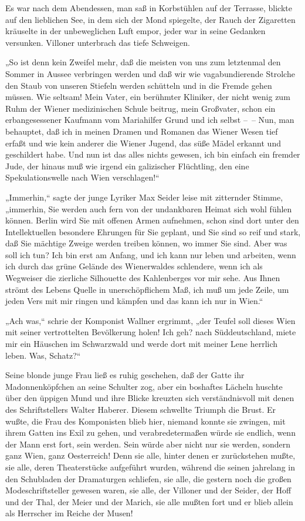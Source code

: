 Es war nach dem Abendessen, man saß in Korbstühlen auf der
Terrasse, blickte auf den lieblichen See, in dem sich der Mond
spiegelte, der Rauch der Zigaretten kräuselte in der unbeweglichen
Luft empor, jeder war in seine Gedanken versunken. Villoner
unterbrach das tiefe Schweigen.

„So ist denn kein Zweifel mehr, daß die meisten von uns zum
letztenmal den Sommer in Aussee verbringen werden und daß wir wie
vagabundierende Strolche den Staub von unseren Stiefeln werden
schütteln und in die Fremde gehen müssen. Wie seltsam! Mein Vater,
ein berühmter Kliniker, der nicht wenig zum Ruhm der Wiener
medizinischen Schule beitrug, mein Großvater, schon ein
erbangesessener Kaufmann vom Mariahilfer Grund und ich selbst –~–
Nun, man behauptet, daß ich in meinen Dramen und Romanen das Wiener
Wesen tief erfaßt und wie kein anderer die Wiener Jugend, das süße
Mädel erkannt und geschildert habe. Und nun ist das alles nichts
gewesen, ich bin einfach ein fremder Jude, der hinaus  muß wie irgend ein galizischer Flüchtling, den eine
Spekulationswelle nach Wien verschlagen!“

„Immerhin,“ sagte der junge Lyriker Max Seider leise mit zitternder
Stimme, „immerhin, Sie werden auch fern von der undankbaren Heimat
sich wohl fühlen können. Berlin wird Sie mit offenen Armen
aufnehmen, schon sind dort unter den Intellektuellen besondere
Ehrungen für Sie geplant, und Sie sind so reif und stark, daß Sie
mächtige Zweige werden treiben können, wo immer Sie sind. Aber was
soll ich tun? Ich bin erst am Anfang, und ich kann nur leben und
arbeiten, wenn ich durch das grüne Gelände des Wienerwaldes
schlendere, wenn ich als Wegweiser die zierliche Silhouette des
Kahlenberges vor mir sehe. Aus Ihnen strömt des Lebens Quelle in
unerschöpflichem Maß, ich muß um jede Zeile, um jeden Vers mit mir
ringen und kämpfen und das kann ich nur in Wien.“

„Ach was,“ schrie der Komponist Wallner ergrimmt, „der Teufel soll
dieses Wien mit seiner vertrottelten Bevölkerung holen! Ich geh?
nach Süddeutschland, miete mir ein Häuschen im Schwarzwald und
werde dort mit meiner Lene herrlich leben. Was, Schatz?“

Seine blonde junge Frau ließ es ruhig geschehen, daß der Gatte ihr
Madonnenköpfchen an seine Schulter zog, aber ein boshaftes Lächeln
huschte über den üppigen Mund und ihre Blicke kreuzten sich
verständnisvoll mit denen des Schriftstellers Walter Haberer.
Diesem schwellte Triumph die Brust. Er wußte, die Frau des
Komponisten blieb hier, niemand konnte sie zwingen, mit ihrem
Gatten ins Exil zu gehen, und verabredetermaßen würde sie endlich,
wenn  der Mann erst fort, sein werden. Sein würde
aber nicht nur sie werden, sondern ganz Wien, ganz Oesterreich!
Denn sie alle, hinter denen er zurückstehen mußte, sie alle, deren
Theaterstücke aufgeführt wurden, während die seinen jahrelang in
den Schubladen der Dramaturgen schliefen, sie alle, die gestern
noch die großen Modeschriftsteller gewesen waren, sie alle, der
Villoner und der Seider, der Hoff und der Thal, der Meier und der
Marich, sie alle mußten fort und er blieb allein als Herrscher im
Reiche der Musen!

